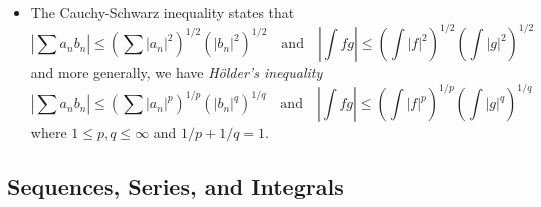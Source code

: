 \documentclass[answers]{exam}
\begin{document}
\begin{itemize}
	\item The Cauchy-Schwarz inequality states that
	\[ \left| \sum a_n b_n \right| \leq \left( \sum |a_n|^2 \right)^{1/2} \left( |b_n|^2 \right)^{1/2} \quad\text{and}\quad \left| \int f g \right| \leq \left( \int |f|^2 \right)^{1/2} \left( \int |g|^2 \right)^{1/2} \]
	and more generally, we have \emph{H\"{o}lder's inequality}
	\[ | \sum a_n b_n | \leq \left( \sum |a_n|^p \right)^{1/p} \left( |b_n|^q \right)^{1/q} \quad\text{and}\quad \left| \int f g \right| \leq \left( \int |f|^p \right)^{1/p} \left( \int |g|^q \right)^{1/q} \]
	where $1 \leq p,q \leq \infty$ and $1/p + 1/q = 1$.


\end{itemize}


\subsection*{Sequences, Series, and Integrals}
\end{document}
